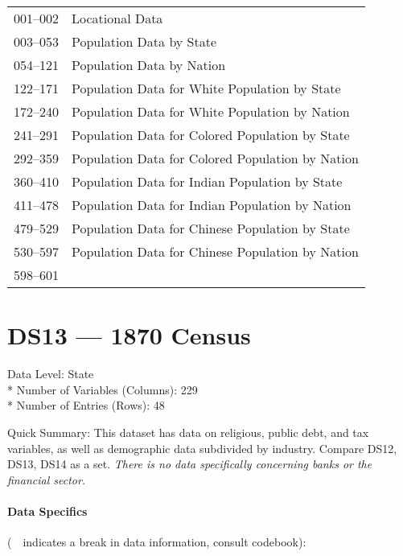 ﻿\documentclass[12pt]{report}
\begin{document}
	\begin{tabular}{r|l}
		001--002 & Locational Data\\
		003--053 & Population Data by State\\
		054--121 & Population Data by Nation\\
		122--171 & Population Data for White Population by State\\
		172--240 & Population Data for White Population by Nation\\
		241--291 & Population Data for Colored Population by State\\
		292--359 & Population Data for Colored Population by Nation\\
		360--410 & Population Data for Indian Population by State\\
		411--478 & Population Data for Indian Population by Nation\\
		479--529 & Population Data for Chinese Population by State\\
		530--597 & Population Data for Chinese Population by Nation\\
		598--601 & \guillemotleft~\guillemotright\\
	\end{tabular}
	\newpage

\section{DS13 --- 1870 Census}
	Data Level: State\\*
	Number of Variables (Columns): 229\\*
	Number of Entries (Rows): 48
	\vspace{1.5em}
	
	\noindent Quick Summary: This dataset has data on religious, public debt, and tax variables, as well as demographic data subdivided by industry. Compare DS12, DS13, DS14 as a set. \textit{There is no data specifically concerning banks or the financial sector.}
	
	\paragraph{Data Specifics} (\guillemotleft~\guillemotright~indicates a break in data information, consult codebook):
	\vspace{1em}
	
\end{document}
